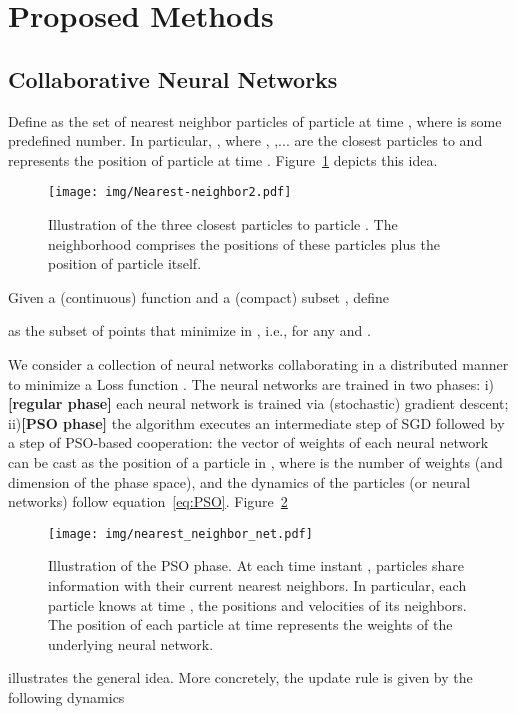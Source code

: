 \documentclass{ieeeaccess}
\begin{document}
\section{Proposed Methods}
\label{sec:proposed}
\subsection{Collaborative Neural Networks}
\label{sec:collab}
Define  as the set of  nearest neighbor particles of particle  at time , where  is some predefined number. In particular, , where , ,...  are the  closest particles to  and  represents the position of particle  at time . Figure~\ref{fig:nn} depicts this idea.
\begin{figure} [htbp!]
\begin{center}
\texttt{[image: img/Nearest-neighbor2.pdf]}
\caption{Illustration of the three closest particles to particle . The neighborhood  comprises the positions of these particles plus the position of particle  itself.}\label{fig:nn}
\end{center}
\end{figure}
Given a (continuous) function  and a (compact) subset , define

as the subset of points that minimize  in , i.e.,  for any  and .

We consider a collection of neural networks collaborating in a distributed manner to minimize a Loss function . The neural networks are trained in two phases: i) \textbf{[regular phase]} each neural network is trained via (stochastic) gradient descent; ii)\textbf{[PSO phase]} the algorithm executes an intermediate step of SGD followed by a step of PSO-based cooperation: the vector of weights of each neural network can be cast as the position of a particle in , where  is the number of weights (and dimension of the phase space), and the dynamics of the particles (or neural networks) follow equation~\eqref{eq:PSO}. Figure~\ref{fig:nnn} 
\begin{figure} [hbt]
\begin{center}
\texttt{[image: img/nearest\_neighbor\_net.pdf]}
\caption{Illustration of the PSO phase. At each time instant , particles share information with their current nearest neighbors. In particular, each particle knows at time , the positions and velocities of its neighbors. The position of each particle at time  represents the weights of the underlying neural network.}\label{fig:nnn}
\end{center}
\end{figure}
illustrates the general idea. More concretely, the update rule is given by the following dynamics
\end{document}
